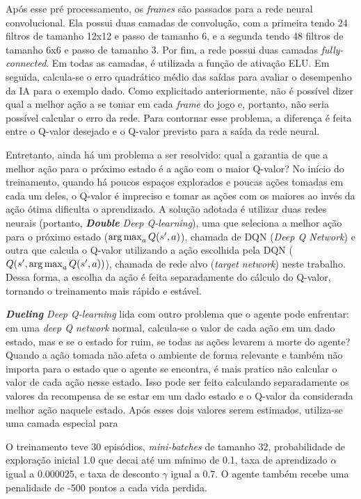 Após esse pré processamento, os \textit{frames} são passados para a rede neural convolucional. Ela possui duas camadas de convolução, com a primeira tendo 24 filtros de tamanho 12x12 e passo de tamanho 6, e a segunda tendo 48 filtros de tamanho 6x6 e passo de tamanho 3.
Por fim, a rede possui duas camadas \textit{fully-connected}.
Em todas as camadas, é utilizada a função de ativação ELU.
Em seguida, calcula-se o erro quadrático médio das saídas para avaliar o desempenho da IA para o exemplo dado.
Como explicitado anteriormente, não é possível dizer qual a melhor ação a se tomar em cada \textit{frame} do jogo e, portanto, não seria possível calcular o erro da rede.
Para contornar esse problema, a diferença é feita entre o Q-valor desejado
e o Q-valor previsto para a saída da rede neural.

Entretanto, ainda há um problema a ser resolvido: qual a garantia de que a melhor ação para o próximo estado é a ação com o maior Q-valor?
No início do treinamento, quando há poucos espaços explorados e poucas ações tomadas em cada um deles, o Q-valor é impreciso e tomar as ações com os maiores ao invés da ação ótima dificulta o aprendizado.
A solução adotada é utilizar duas redes neurais (portanto, \textit{\textbf{Double} Deep Q-learning}), uma que seleciona a melhor ação para o próximo estado ($\operatorname*{arg\,max}_{a}Q(s',a)$), chamada de DQN (\textit{Deep Q Network}) e outra que calcula o Q-valor utilizando a ação escolhida pela DQN ($Q(s', \operatorname*{arg\,max}_{a}Q(s',a))$), chamada de rede alvo (\textit{target network}) neste trabalho. Dessa forma, a escolha da ação é feita separadamente do cálculo do Q-valor, tornando o treinamento mais rápido e estável.

\textit{\textbf{Dueling} Deep Q-learning} lida com outro problema que o agente pode enfrentar: em uma \textit{deep Q network} normal, calcula-se o valor de cada ação em um dado estado, mas e se o estado for ruim, se todas as ações levarem a morte do agente?
Quando a ação tomada não afeta o ambiente de forma relevante e também não importa para o estado que o agente se encontra, é mais pratico não calcular o valor de cada ação nesse estado.
Isso pode ser feito calculando separadamente os valores da recompensa de se estar em um dado estado e o Q-valor da considerada melhor ação naquele estado.
Após esses dois valores serem estimados, utiliza-se uma camada especial para

O treinamento teve 30 episódios, \textit{mini-batches} de tamanho 32, probabilidade de exploração inicial 1.0 que decai até um mínimo de 0.1, taxa de aprendizado $\alpha$ igual a 0.000025, e taxa de desconto $\gamma$ igual a 0.7. O agente também recebe uma penalidade de -500 pontos a cada vida perdida.

